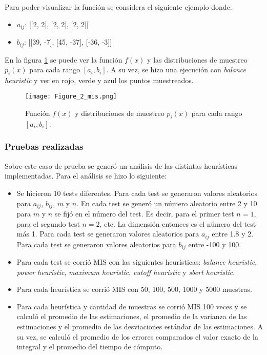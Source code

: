 \documentclass{article}
\begin{document}
Para poder visualizar la función se considera el siguiente ejemplo donde:

\begin{itemize}
    \item \textbf{\( a_{ij} \)}: [[2, 2], [2, 2], [2, 2]]
    \item \textbf{\( b_{ij} \)}: [[39, -7], [45, -37], [-36, -3]]
\end{itemize}

En la figura \ref{fig:mis2} se puede ver la función \( f(x) \) y las distribuciones de muestreo \( p_{i}(x) \) para cada rango \( [a_{i}, b_{i}] \).
A su vez, se hizo una ejecución con \textit{balance heuristic} y ver en rojo, verde y azul los puntos muestreados.

\begin{figure}[H]
\texttt{[image: Figure\_2\_mis.png]}
\caption{Función \( f(x) \) y distribuciones de muestreo \( p_{i}(x) \) para cada rango \( [a_{i}, b_{i}] \).}
\label{fig:mis2}
\end{figure}

\subsubsection{Pruebas realizadas}

Sobre este caso de prueba se generó un análisis de las distintas heurísticas implementadas.
Para el análisis se hizo lo siguiente:
\begin{itemize}
    \item Se hicieron 10 tests diferentes. Para cada test se generaron valores aleatorios para \( a_{ij} \), \( b_{ij} \), \( m \) y \( n \).
          En cada test se generó un número aleatorio entre 2 y 10 para \( m \) y \( n \) se fijó en el número del test.
          Es decir, para el primer test \( n = 1 \), para el segundo test \( n = 2 \), etc. La dimensión entonces es el número del test más 1.
          Para cada test se generaron valores aleatorios para \( a_{ij} \) entre 1.8 y 2.
          Para cada test se generaron valores aleatorios para \( b_{ij} \) entre -100 y 100.
    \item Para cada test se corrió MIS con las siguientes heurísticas: \textit{balance heuristic}, \textit{power heuristic}, \textit{maximum heuristic}, \textit{cutoff heuristic} y \textit{sbert heuristic}.
    \item Para cada heurística se corrió MIS con 50, 100, 500, 1000 y 5000 muestras.
    \item Para cada heurística y cantidad de muestras se corrió MIS 100 veces y se calculó el promedio de las estimaciones,
          el promedio de la varianza de las estimaciones y el promedio de las desviaciones estándar de las estimaciones.
          A su vez, se calculó el promedio de los errores comparados el valor exacto de la integral y el promedio del tiempo de cómputo.
\end{itemize}
\end{document}
